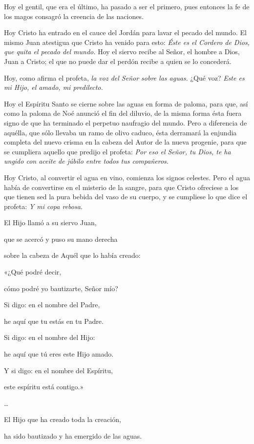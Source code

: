\documentclass[]{article}
\begin{document}
Hoy el gentil, que era el último, ha pasado a ser el primero, pues
entonces la fe de los magos consagró la creencia de las naciones.

Hoy Cristo ha entrado en el cauce del Jordán para lavar el pecado del
mundo. El mismo Juan atestigua que Cristo ha venido para esto:
\emph{Éste es el Cordero de Dios, que quita el pecado del mundo.} Hoy el
siervo recibe al Señor, el hombre a Dios, Juan a Cristo; el que no puede
dar el perdón recibe a quien se lo concederá.

Hoy, como afirma el profeta, \emph{la voz del Señor sobre las aguas.}
¿Qué voz? \emph{Este es mi Hijo, el amado, mi predilecto.}

Hoy el Espíritu Santo se cierne sobre las aguas en forma de paloma, para
que, así como la paloma de Noé anunció el fin del diluvio, de la misma
forma ésta fuera signo de que ha terminado el perpetuo naufragio del
mundo. Pero a diferencia de aquélla, que sólo llevaba un ramo de olivo
caduco, ésta derramará la enjundia completa del nuevo crisma en la
cabeza del Autor de la nueva progenie, para que se cumpliera aquello que
predijo el profeta: \emph{Por eso el Señor, tu Dios, te ha ungido con
aceite de júbilo entre todos tus compañeros.}

Hoy Cristo, al convertir el agua en vino, comienza los signos celestes.
Pero el agua había de convertirse en el misterio de la sangre, para que
Cristo ofreciese a los que tienen sed la pura bebida del vaso de su
cuerpo, y se cumpliese lo que dice el profeta: \emph{Y mi copa rebosa.}

El Hijo llamó a su siervo Juan,

que se acercó y puso su mano derecha

sobre la cabeza de Aquél que lo había creado:

«¿Qué podré decir,

cómo podré yo bautizarte, Señor mío?

Si digo: en el nombre del Padre,

he aquí que tu estás en tu Padre.

Si digo: en el nombre del Hijo:

he aquí que tú eres este Hijo amado.

Y si digo: en el nombre del Espíritu,

este espíritu está contigo.»

\ldots{}

El Hijo que ha creado toda la creación,

ha sido bautizado y ha emergido de las aguas.
\end{document}
